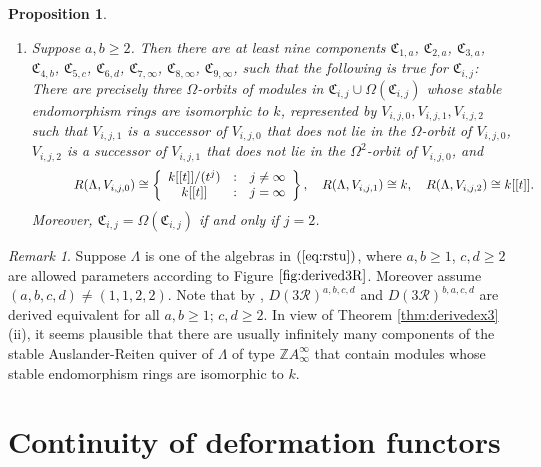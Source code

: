 \documentclass{amsart}
\theoremstyle{plain}
\newtheorem{prop}[thm]{Proposition}
\theoremstyle{definition}
\theoremstyle{remark}
\newtheorem{rem}[thm]{Remark}
\begin{document}
\begin{prop}
\begin{enumerate}
$$R(\Lambda,V_{i,j,0})\cong k[[t]]/(t^j), \quad R(\Lambda,V_{i,j,1})\cong k, \quad R(\Lambda,V_{i,j,2})\cong k[[t]].$$
Moreover, $\mathfrak{C}_{i,j}=\Omega(\mathfrak{C}_{i,j})$ if and only if $j=2$.
\item[(iv)] Suppose $a,b\ge 2$. Then there are at least nine components 
$\mathfrak{C}_{1,a}$, $\mathfrak{C}_{2,a}$, $\mathfrak{C}_{3,a}$, $\mathfrak{C}_{4,b}$, $\mathfrak{C}_{5,c}$, $\mathfrak{C}_{6,d}$,
$\mathfrak{C}_{7,\infty}$, $\mathfrak{C}_{8,\infty}$, $\mathfrak{C}_{9,\infty}$, 
such that the following is true for $\mathfrak{C}_{i,j}$:
There are precisely three $\Omega$-orbits of modules in $\mathfrak{C}_{i,j}\cup\Omega(\mathfrak{C}_{i,j})$ whose stable endomorphism rings 
are isomorphic to $k$, represented by $V_{i,j,0},V_{i,j,1},V_{i,j,2}$ such that $V_{i,j,1}$ is a successor of $V_{i,j,0}$ that does not lie in the 
$\Omega$-orbit of $V_{i,j,0}$, $V_{i,j,2}$ is a successor of $V_{i,j,1}$ that does not lie in the $\Omega^2$-orbit of $V_{i,j,0}$, and
$$\qquad \,\quad R(\Lambda,V_{i,j,0})\cong \left\{\begin{array}{c@{\quad:\quad}l}k[[t]]/(t^j)&j\neq\infty\\k[[t]]&j=\infty\end{array}\right\}, \quad R(\Lambda,V_{i,j,1})\cong k, \quad R(\Lambda,V_{i,j,2})\cong k[[t]].$$
Moreover, $\mathfrak{C}_{i,j}=\Omega(\mathfrak{C}_{i,j})$ if and only if $j=2$.
\end{enumerate}
\end{prop}

\begin{rem}
\label{rem:infinite}
Suppose $\Lambda$ is one of the algebras in $(\ref{eq:rstu})$, where $a,b\ge 1$, $c,d\ge 2$ are allowed parameters according to 
Figure $\ref{fig:derived3R}$. Moreover assume $(a,b,c,d)\neq (1,1,2,2)$. 
Note that by \cite[Lemma 3.15]{holm}, $D(3\mathcal{R})^{a,b,c,d}$ and $D(3\mathcal{R})^{b,a,c,d}$ are derived equivalent for all
$a,b\ge 1$; $c,d\ge 2$. In view of Theorem \ref{thm:derivedex3}(ii), it seems plausible that there are usually infinitely many components of 
the stable Auslander-Reiten quiver of $\Lambda$ of type $\mathbb{Z}A_\infty^\infty$ that contain modules whose stable endomorphism 
rings are isomorphic to $k$.
\end{rem}

\appendix
\section{Continuity of deformation functors}
\label{s:continuity}
\setcounter{equation}{0}
\end{document}

